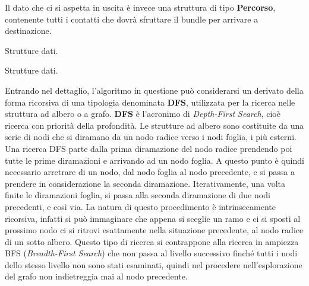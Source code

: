 \documentclass[12pt,a4paper,oneside]{book}
\begin{document}
		Il dato che ci si aspetta in uscita è invece una struttura di tipo {\bf Percorso}, contenente tutti i contatti che dovrà sfruttare il bundle per arrivare a destinazione.
		
		\vspace{10pt}
		\begin{algorithm}
			\caption{Strutture dati.}
			
			
			\caption{Strutture dati.}
			\label{strutDati}
		\end{algorithm}

		Entrando nel dettaglio, l'algoritmo in questione può considerarsi un derivato della forma ricorsiva di una tipologia denominata {\bf DFS}, utilizzata per la ricerca nelle struttura ad albero o a grafo. {\bf DFS} è l'acronimo di {\it Depth-First Search}, cioè ricerca con priorità della profondità. Le strutture ad albero sono costituite da una serie di nodi che si diramano da un nodo radice verso i nodi foglia, i più esterni. Una ricerca DFS parte dalla prima diramazione del nodo radice prendendo poi tutte le prime diramazioni e arrivando ad un nodo foglia. A questo punto è quindi necessario arretrare di un nodo, dal nodo foglia al nodo precedente, e si passa a prendere in considerazione la seconda diramazione. Iterativamente, una volta finite le diramazioni foglia, si passa alla seconda diramazione di due nodi precedenti, e così via. La natura di questo procedimento è intrinsecamente ricorsiva, infatti si può immaginare che appena si sceglie un ramo e ci si sposti al prossimo nodo ci si ritrovi esattamente nella situazione precedente, al nodo radice di un sotto albero. Questo tipo di ricerca si contrappone alla ricerca in ampiezza BFS ({\it Breadth-First Search}) che non passa al livello successivo finché tutti i nodi dello stesso livello non sono stati esaminati, quindi nel procedere nell'esplorazione del grafo non indietreggia mai al nodo precedente. 
		
\end{document}
